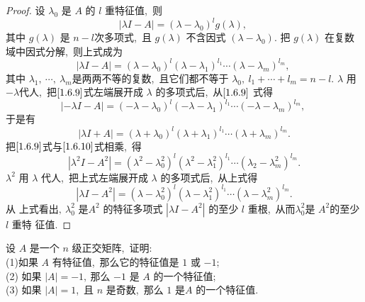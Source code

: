 \begin{proof}
	设 $ \lambda_{0} $ 是  $A$  的  $l$  重特征值,\ 则
	$$|\lambda I-A|=\left(\lambda-\lambda_{0}\right)^{l} g(\lambda),\ $$
	其中 $ g(\lambda) $ 是 $ n-l  $次多项式,\  且 $ g(\lambda) $ 不含因式 $ \left(\lambda-\lambda_{0}\right) .$
	把  $g(\lambda)$  在复数域中因式分解,\  则上式成为
	\begin{equation}
		|\lambda I-A|=\left(\lambda-\lambda_{0}\right)^{l}\left(\lambda-\lambda_{1}\right)^{l_{1}} \cdots\left(\lambda-\lambda_{m}\right)^{l_{m}} ,\ \label{1.6.9}
	\end{equation}
	其中 $ \lambda_{1},\  \cdots,\  \lambda_{m}  $是两两不等的复数,\  且它们都不等于  $\lambda_{0},\  l_{1}+\cdots+l_{m}=n-l.$ 
	$\lambda $ 用$  -\lambda  $代人,\  把$\eqref{1.6.9}$式左端展开成  $\lambda $ 的多项式后,\  从$\eqref{1.6.9}$ 式得
	$$|-\lambda I-A|=\left(-\lambda-\lambda_{0}\right)^{l}\left(-\lambda-\lambda_{1}\right)^{l_{1}} \cdots\left(-\lambda-\lambda_{m}\right)^{l_{m}} ,\ $$
	于是有
	\begin{equation}
		|\lambda I+A|=\left(\lambda+\lambda_{0}\right)^{l}\left(\lambda+\lambda_{1}\right)^{l_{1}} \cdots\left(\lambda+\lambda_{m}\right)^{l_{m}} .\label{1.6.10}
	\end{equation}
	把$\eqref{1.6.9}$式与$\eqref{1.6.10}$式相乘,\ 得
	$$\left|\lambda^{2} I-A^{2}\right|=\left(\lambda^{2}-\lambda_{0}^{2}\right)^{l}\left(\lambda^{2}-\lambda_{1}^{2}\right)^{l_1} \cdots\left(\lambda_{2}-\lambda_{m}^{2}\right)^{l_m}  .$$
	$\lambda^{2} $ 用  $\lambda $ 代人,\  把上式左端展开成  $\lambda $ 的多项式后,\  从上式得
	$$\left|\lambda I-A^{2}\right|=\left(\lambda-\lambda_{0}^{2}\right)^{l}\left(\lambda-\lambda_{1}^{2}\right)^{l_{1}} \cdots\left(\lambda-\lambda_{m}^{2}\right)^{l_m} .$$
	从 上式看出$,\   \lambda_{0}^{2} $ 是$  A^{2}$  的特征多项式 $ \left|\lambda I-A^{2}\right| $ 的至少  $l$  重根,\  从而$  \lambda_{0}^{2}  $是  $A^{2}  $的至少  $l $ 重特 征值.
\end{proof}
\newpage
\begin{problem}
	设 $ A $ 是一个  $n$  级正交矩阵,\  证明:\\
	(1)如果  $A$  有特征值,\  那么它的特征值是 $1$ 或 $ -1 ;$\\
	(2) 如果  $|A|=-1 ,\  $那么 $ -1$  是  $A $ 的一个特征值;\\
	(3) 如果 $ |A|=1 $,\  且  $n $ 是奇数,\ 那么 $1$ 是$  A$  的一个特征值.
\end{problem}
